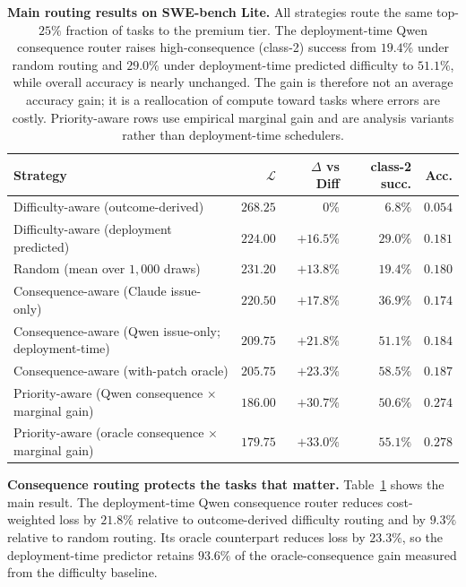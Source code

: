 \documentclass{article}
\begin{document}
\begin{table}[t]
\centering
\caption{\textbf{Main routing results on SWE-bench Lite.} All strategies
route the same top-$25\%$ fraction of tasks to the premium tier. The
deployment-time Qwen consequence router raises high-consequence
(class-2) success from $19.4\%$ under random routing and $29.0\%$
under deployment-time predicted difficulty to $51.1\%$, while overall
accuracy is nearly unchanged. The gain is therefore not an average
accuracy gain; it is a reallocation of compute toward tasks where
errors are costly. Priority-aware rows use empirical marginal gain and
are analysis variants rather than deployment-time schedulers.}
\label{tab:main}
\small
\begin{tabular}{lrrrr}
\toprule
Strategy & $\mathcal{L}$ & $\Delta$ vs Diff & class-2 succ. & Acc. \\
\midrule
Difficulty-aware (outcome-derived)                         & $268.25$ & ~~$0\%$ & $6.8\%$ & $0.054$ \\
Difficulty-aware (deployment predicted)                    & $224.00$ & $+16.5\%$ & $29.0\%$ & $0.181$ \\
Random (mean over $1{,}000$ draws)                         & $231.20$ & $+13.8\%$ & $19.4\%$ & $0.180$ \\
\midrule
Consequence-aware (Claude issue-only)                      & $220.50$ & $+17.8\%$ & $36.9\%$ & $0.174$ \\
Consequence-aware (Qwen issue-only; deployment-time)        & $209.75$ & $+21.8\%$ & $\mathbf{51.1\%}$ & $0.184$ \\
Consequence-aware (with-patch oracle)                       & $205.75$ & $+23.3\%$ & $58.5\%$ & $0.187$ \\
\midrule
Priority-aware (Qwen consequence $\times$ marginal gain)    & $\mathbf{186.00}$ & $\mathbf{+30.7\%}$ & $50.6\%$ & $\mathbf{0.274}$ \\
Priority-aware (oracle consequence $\times$ marginal gain)  & $179.75$ & $+33.0\%$ & $55.1\%$ & $0.278$ \\
\bottomrule
\end{tabular}
\end{table}

\textbf{Consequence routing protects the tasks that matter.}
Table~\ref{tab:main} shows the main result. The deployment-time Qwen
consequence router reduces cost-weighted loss by $21.8\%$ relative to
outcome-derived difficulty routing and by $9.3\%$ relative to random
routing. Its oracle counterpart reduces loss by $23.3\%$, so the
deployment-time predictor retains $93.6\%$ of the oracle-consequence
gain measured from the difficulty baseline.
\end{document}
